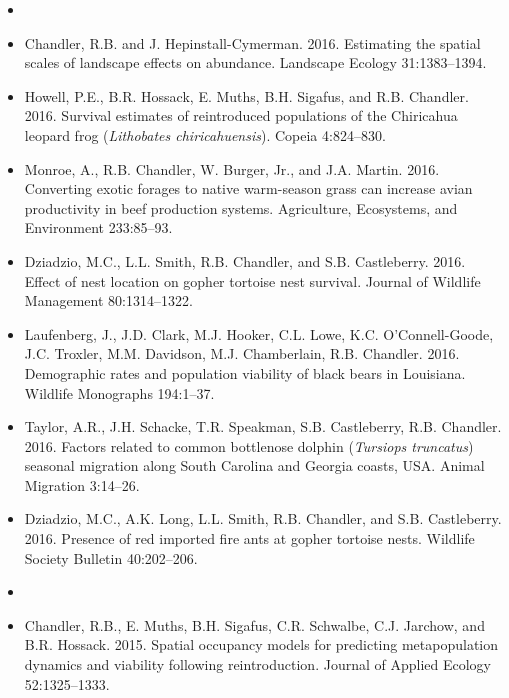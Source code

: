 \documentclass[12pt]{article}
\begin{document}
\begin{itemize}


\item[] { \\}

\item Chandler, R.B. and J. Hepinstall-Cymerman. 2016. Estimating
  the spatial scales of landscape effects on abundance. Landscape
  Ecology 31:1383--1394. 

\item Howell, P.E., B.R. Hossack, E. Muths, B.H. Sigafus, and
  R.B. Chandler. 2016. Survival estimates of reintroduced populations
  of the Chiricahua leopard frog ({\it Lithobates
    chiricahuensis}). Copeia 4:824--830.   

\item Monroe, A., R.B. Chandler, W. Burger, Jr., and J.A. Martin. 2016. 
  Converting exotic forages to native warm-season grass can
  increase avian productivity in beef production systems. Agriculture,
  Ecosystems, and Environment 233:85--93. 

\item Dziadzio, M.C., L.L. Smith, R.B. Chandler, and
  S.B. Castleberry. 2016. Effect of nest location on gopher
  tortoise nest survival. Journal of Wildlife Management 80:1314--1322.

\item Laufenberg, J., J.D. Clark, M.J. Hooker, C.L. Lowe,
  K.C. O'Connell-Goode, J.C. Troxler, M.M. Davidson, M.J. Chamberlain,
  R.B. Chandler. 2016. Demographic rates and population viability
  of black bears in Louisiana. Wildlife Monographs 194:1--37.

\item Taylor, A.R., J.H. Schacke, T.R. Speakman, S.B. Castleberry,
  R.B. Chandler. 2016. Factors related to common bottlenose dolphin
  ({\it Tursiops truncatus}) seasonal migration along South Carolina
  and Georgia coasts, USA. Animal Migration 3:14--26.

\item Dziadzio, M.C., A.K. Long, L.L. Smith, R.B. Chandler, and
  S.B. Castleberry. 2016. Presence of red imported fire ants at
  gopher tortoise nests. Wildlife Society Bulletin 40:202--206.  


\item[] { \\}

\item Chandler, R.B., E. Muths, B.H. Sigafus, C.R. Schwalbe,
  C.J. Jarchow, and B.R. Hossack. 2015. Spatial occupancy models for
  predicting metapopulation dynamics and viability following
  reintroduction. Journal of Applied Ecology 52:1325--1333.


\end{itemize}
\end{document}
